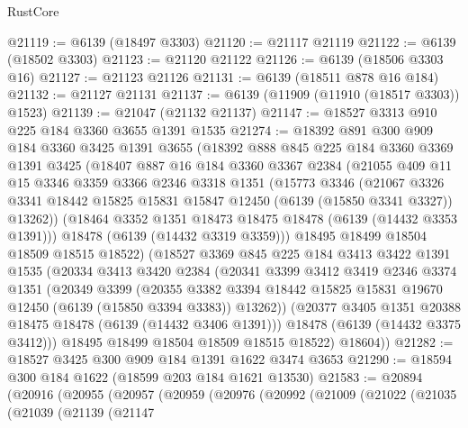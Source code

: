 \begin{lexlean}{RustCore}
\begin{coremodule}
@21119 := @6139 (@18497 @3303)
@21120 := @21117 @21119
@21122 := @6139 (@18502 @3303)
@21123 := @21120 @21122
@21126 := @6139 (@18506 @3303 @16)
@21127 := @21123 @21126
@21131 := @6139 (@18511 @878 @16 @184)
@21132 := @21127 @21131
@21137 := @6139 (@11909 (@11910 (@18517 @3303)) @1523)
@21139 := @21047 (@21132 @21137)
@21147 := @18527 @3313 @910 @225 @184 @3360 @3655 @1391 @1535
@21274 := @18392
    @891
    @300
    @909
    @184
    @3360
    @3425
    @1391
    @3655
    (@18392
      @888
      @845
      @225
      @184
      @3360
      @3369
      @1391
      @3425
      (@18407
        @887
        @16
        @184
        @3360
        @3367
        @2384
        (@21055
          @409
          @11
          @15
          @3346
          @3359
          @3366
          @2346
          @3318
          @1351
          (@15773
            @3346
            (@21067
              @3326
              @3341
              @18442
              @15825
              @15831
              @15847
              @12450
              (@6139 (@15850 @3341 @3327))
              @13262))
          (@18464 @3352 @1351 @18473 @18475 @18478 (@6139 (@14432 @3353 @1391)))
          @18478
          (@6139 (@14432 @3319 @3359)))
        @18495
        @18499
        @18504
        @18509
        @18515
        @18522)
      (@18527
        @3369
        @845
        @225
        @184
        @3413
        @3422
        @1391
        @1535
        (@20334
          @3413
          @3420
          @2384
          (@20341
            @3399
            @3412
            @3419
            @2346
            @3374
            @1351
            (@20349
              @3399
              (@20355
                @3382
                @3394
                @18442
                @15825
                @15831
                @19670
                @12450
                (@6139 (@15850 @3394 @3383))
                @13262))
            (@20377 @3405 @1351 @20388 @18475 @18478 (@6139 (@14432 @3406 @1391)))
            @18478
            (@6139 (@14432 @3375 @3412)))
          @18495
          @18499
          @18504
          @18509
          @18515
          @18522)
        @18604))
@21282 := @18527 @3425 @300 @909 @184 @1391 @1622 @3474 @3653
@21290 := @18594 @300 @184 @1622 (@18599 @203 @184 @1621 @13530)
@21583 := @20894
    (@20916
      (@20955
        (@20957
          (@20959
            (@20976
              (@20992
                (@21009
                  (@21022
                    (@21035
                      (@21039
                        (@21139
                          (@21147

\end{coremodule}
\end{lexlean}
